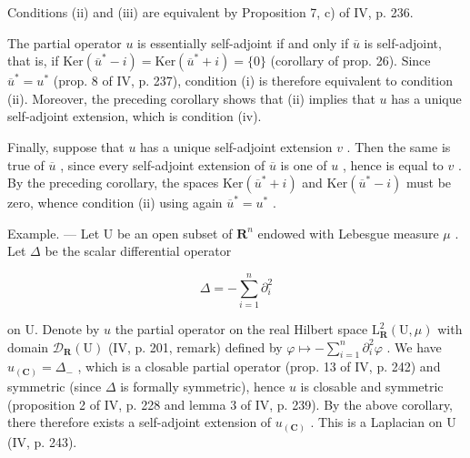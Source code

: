 Conditions (ii) and (iii) are equivalent by Proposition 7, c) of IV, p. 236.

The partial operator \(u\) is essentially self-adjoint if and only if \(\overline{u}\) is self-adjoint, that is, if \(\text{Ker}(\overline{u}^* - i) = \text{Ker}(\overline{u}^* + i) = \{0\}\) (corollary of prop. 26). Since \(\overline{u}^* = u^*\) (prop. 8 of IV, p. 237), condition (i) is therefore equivalent to condition (ii). Moreover, the preceding corollary shows that (ii) implies that \(u\) has a unique self-adjoint extension, which is condition (iv).

Finally, suppose that \(u\) has a unique self-adjoint extension \(v\) . Then the same is true of \(\overline{u}\) , since every self-adjoint extension of \(\overline{u}\) is one of \(u\) , hence is equal to \(v\) . By the preceding corollary, the spaces \(\mathrm{Ker}(\overline{u}^{*} + i)\) and \(\mathrm{Ker}(\overline{u}^{*} - i)\) must be zero, whence condition (ii) using again \(\overline{u}^{*} = u^{*}\) .

Example. --- Let U be an open subset of \(\mathbf{R}^{n}\) endowed with Lebesgue measure \(\mu\) . Let \(\Delta\) be the scalar differential operator

\[
\Delta = - \sum_ {i = 1} ^ {n} \partial_ {i} ^ {2}
\]

on U. Denote by \(u\) the partial operator on the real Hilbert space \(\mathrm{L}_{\mathbf{R}}^{2}(\mathrm{U},\mu)\) with domain \(\mathcal{D}_{\mathbf{R}}(\mathrm{U})\) (IV, p. 201, remark) defined by \(\varphi \mapsto -\sum_{i=1}^{n}\partial_{i}^{2}\varphi\) . We have \(u_{(\mathbf{C})} = \Delta_{-}\) , which is a closable partial operator (prop. 13 of IV, p. 242) and symmetric (since \(\Delta\) is formally symmetric), hence \(u\) is closable and symmetric (proposition 2 of IV, p. 228 and lemma 3 of IV, p. 239). By the above corollary, there therefore exists a self-adjoint extension of \(u_{(\mathbf{C})}\) . This is a Laplacian on U (IV, p. 243).

